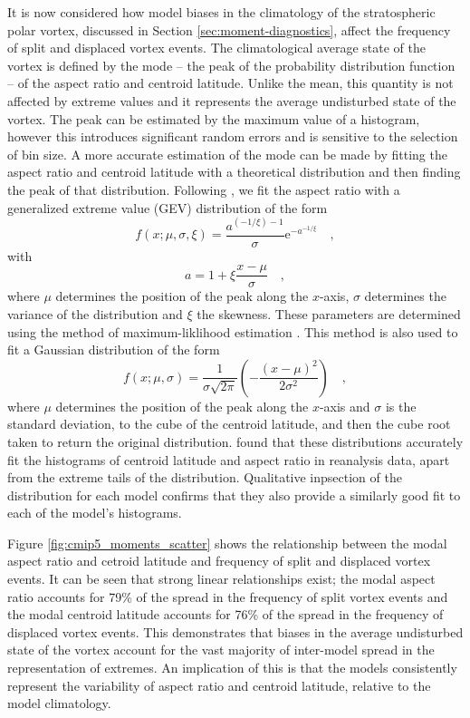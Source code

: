 \bigskip It is now considered how model biases in the climatology of the
stratospheric polar vortex, discussed in Section \ref{sec:moment-diagnostics},
affect the frequency of split and displaced vortex events. The climatological
average state of the vortex is defined by the mode -- the peak of the
probability distribution function -- of the aspect ratio and centroid
latitude. Unlike the mean, this quantity is not affected by extreme values and
it represents the average undisturbed state of the vortex. The peak can be
estimated by the maximum value of a histogram, however this introduces
significant random errors and is sensitive to the selection of bin size. A more
accurate estimation of the mode can be made by fitting the aspect ratio and
centroid latitude with a theoretical distribution and then finding the peak of
that distribution. Following \citet{Mitchell2011}, we fit the aspect ratio with
a generalized extreme value (GEV) distribution of the form
\begin{equation}
f(x;\mu,\sigma,\xi) = \frac{a^{(-1/\xi)-1}}{\sigma}\mathrm{e}^{{-a}^{-1/\xi}}
\quad , 
\end{equation}
with
\begin{equation} 
a = 1 + \xi \frac{x-\mu}{\sigma} \quad ,
\end{equation}
where $\mu$ determines the position of the peak along the $x$-axis, $\sigma$
determines the variance of the distribution and $\xi$ the skewness. These
parameters are determined using the method of maximum-liklihood estimation
\citep{Wilks}. This method is also used to fit a Gaussian distribution of the
form
\begin{equation}
f(x;\mu,\sigma) = \frac{1}{\sigma\sqrt{2\pi}} \left(
  -\frac{(x-\mu)^2}{2\sigma^{2}} \right) \quad ,
\end{equation}
where $\mu$ determines the position of the peak along the $x$-axis and $\sigma$
is the standard deviation, to the cube of the centroid latitude, and then the
cube root taken to return the original distribution. \citet{Mitchell2011} found
that these distributions accurately fit the histograms of centroid latitude and
aspect ratio in reanalysis data, apart from the extreme tails of the
distribution. Qualitative inpsection of the distribution for each model confirms
that they also provide a similarly good fit to each of the model's histograms.

Figure \ref{fig:cmip5_moments_scatter} shows the relationship between the modal
aspect ratio and cetroid latitude and frequency of split and displaced vortex
events. It can be seen that strong linear relationships exist; the modal aspect
ratio accounts for 79\% of the spread in the frequency of split vortex events
and the modal centroid latitude accounts for 76\% of the spread in the frequency
of displaced vortex events. This demonstrates that biases in the average
undisturbed state of the vortex account for the vast majority of inter-model
spread in the representation of extremes. An implication of this is that the
models consistently represent the variability of aspect ratio and centroid
latitude, relative to the model climatology.

